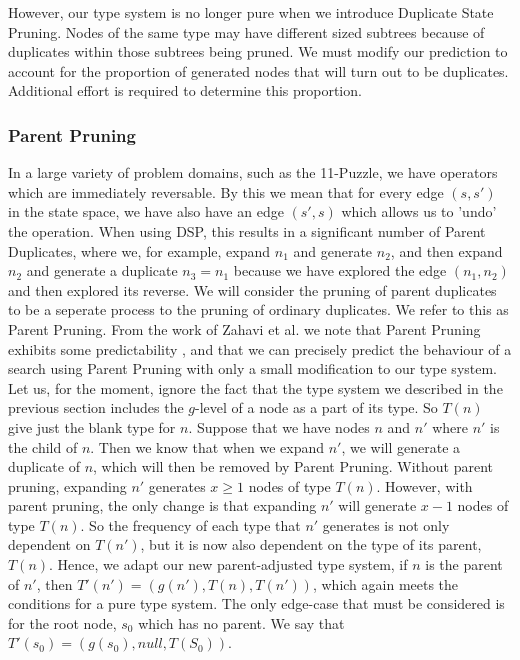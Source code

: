 \documentclass{article}
\begin{document}
However, our type system is no longer pure when we introduce
Duplicate State Pruning. Nodes of the same type may have different sized subtrees
 because of duplicates within those subtrees being pruned.
We must modify our prediction to account for the proportion of
generated nodes that will turn out to be duplicates.
Additional effort is required to determine this proportion.

\subsubsection*{Parent Pruning}

In a large variety of problem domains, such as the 11-Puzzle, we have operators
which are immediately reversable.
By this we mean that for every edge \((s, s')\) in the state space,
we have also have an edge \((s', s)\) which allows us to 'undo' the operation.
When using DSP, this results in a significant number of Parent Duplicates,
where we, for example, expand \(n_1\) and generate \(n_2\), and then expand \(n_2\)
and generate a duplicate \(n_3 = n_1\) because we have explored the edge \((n_1, n_2)\)
and then explored its reverse.
We will consider the pruning of parent duplicates
to be a seperate process to the pruning of ordinary duplicates.
We refer to this as Parent Pruning.
From the work of Zahavi et al. we note that Parent Pruning exhibits
some predictability \cite{zahavi2010predicting},
and that we can precisely predict the behaviour of a search using Parent Pruning
with only a small modification to our type system. \\

Let us, for the moment, ignore the fact that the type system we described in the
previous section includes the \(g\)-level of a node as a part of its type.
So \(T(n)\) give just the blank type for \(n\).
Suppose that we have nodes \(n\) and \(n'\) where \(n'\) is the child of \(n\).
Then we know that when we expand \(n'\), we will generate a duplicate of \(n\),
which will then be removed by Parent Pruning.
Without parent pruning, expanding \(n'\) generates \(x \geq 1\) nodes of type \(T(n)\).
However, with parent pruning, the only change is that expanding \(n'\) will generate \(x - 1\) nodes of type \(T(n)\).
So the frequency of each type that \(n'\) generates is not only dependent on \(T(n')\),
but it is now also dependent on the type of its parent, \(T(n)\).
Hence, we adapt our new parent-adjusted type system, if \(n\) is the parent of \(n'\), then \(T'(n') = (g(n'), T(n), T(n'))\),
which again meets the conditions for a pure type system.
The only edge-case that must be considered is for the root node, \(s_0\) which has no parent.
We say that \(T'(s_0) = (g(s_0), null, T(S_0))\). \\
\end{document}
